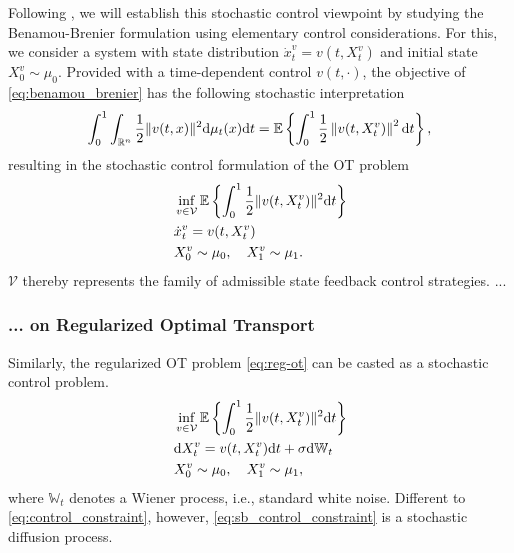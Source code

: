 Following \citet{chen2021optimal, chen2021stochastic}, we will establish this stochastic control viewpoint by studying the Benamou-Brenier formulation using elementary control considerations.
For this, we consider a system with state distribution $\dot{x}^v_t = v(t, X^v_t)$ and initial state $X^v_0 \sim \mu_0$. Provided with a time-dependent control $v(t, \cdot)$, the objective of \eqref{eq:benamou_brenier} has the following stochastic interpretation
\begin{equation*}
	\int_0^1 \int_{\mathbb{R}^n} \frac{1}{2}\lVert v(t, x)\rVert^2 \mathrm{d}\mu_t(x) \mathrm{d}t = \mathbb{E}\left\{\int_0^1 \frac{1}{2}\left\|v(t, X^v_t)\right\|^2 \mathrm{d}t\right\},
\end{equation*}
resulting in the stochastic control formulation of the OT problem 
\begin{align}
& \inf _{v \in \mathcal{V}} \mathbb{E}\left\{\int_0^1 \frac{1}{2}\lVert v(t, X^v_t)\rVert^2 \mathrm{d}t\right\} \\
\label{eq:control_constraint} & \dot{x}^v_t=v(t, X^v_t) \\
\nonumber & X^v_0 \sim \mu_0, \quad X^v_1 \sim \mu_1.
\end{align}
$\mathcal{V}$ thereby represents the family of admissible state feedback control strategies.
...

\subsubsection*{... on Regularized Optimal Transport}

Similarly, the regularized OT problem \eqref{eq:reg-ot} can be casted as a stochastic control problem.
\begin{align}
\label{eq:sb_control}
& \inf _{v \in \mathcal{V}} \mathbb{E}\left\{\int_0^1 \frac{1}{2}\lVert v(t, X^v_t)\rVert^2 \mathrm{d} t\right\}\\
\label{eq:sb_control_constraint}
& \mathrm{d} X^v_t = v(t, X^v_t) \mathrm{d} t + \sigma \mathrm{d} \mathbb{W}_t \\
\nonumber & X^v_0 \sim \mu_0, \quad X^v_1 \sim \mu_1,
\end{align}
where $\mathbb{W}_t $ denotes a Wiener process, i.e., standard white noise. 
Different to \eqref{eq:control_constraint}, however, \eqref{eq:sb_control_constraint} is a stochastic diffusion process.

